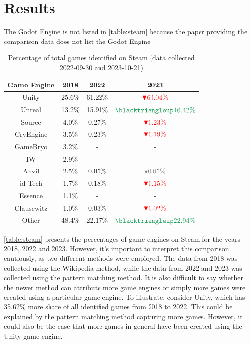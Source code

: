 \section{Results}
The Godot Engine is not listed in \autoref{table:steam} because the paper providing the comparison data does not list the Godot Engine. \\ 

\begin{table}[ht!]
    \centering
    \begin{tabular}{|c c c c|}
        \hline
        Game Engine & 2018   & 2022    & 2023    \\
        \hline\hline
        Unity       & 25.6\% & 61.22\% & $\textcolor{red}{\blacktriangledown 60.04\%}$  \\
        Unreal      & 13.2\% & 15.91\% & $\textcolor{ForestGreen}{\blacktriangleup 16.42\%}$  \\
        Source      & 4.0\%  & 0.27\%  & $\textcolor{red}{\blacktriangledown 0.23\%}$   \\
        CryEngine   & 3.5\%  & 0.23\%  & $\textcolor{red}{\blacktriangledown 0.19\%}$   \\
        GameBryo    & 3.2\%  & -       & -       \\
        IW          & 2.9\%  & -       & -       \\
        Anvil       & 2.5\%  & 0.05\%  & $\textcolor{gray}{\bullet 0.05\%}$   \\
        id Tech     & 1.7\%  & 0.18\%  & $\textcolor{red}{\blacktriangledown 0.15\%}$   \\
        Essence     & 1.1\%  & -       & -       \\
        Clausewitz  & 1.0\%  & 0.03\%  & $\textcolor{red}{\blacktriangledown 0.02\% }$  \\
        Other       & 48.4\% & 22.17\% & $\textcolor{ForestGreen}{\blacktriangleup 22.94\%}$  \\
        \hline
    \end{tabular}
    \caption{Percentage of total games identified on Steam (data collected 2022-09-30 and 2023-10-21)}
    \label{table:steam}
\end{table}

\autoref{table:steam} presents the percentages of game engines on Steam for the years 2018, 2022 and 2023.
However, it's important to interpret this comparison cautiously, as two different methods were employed.
The data from 2018 was collected using the Wikipedia method, while the data from 2022 and 2023 was collected using the pattern matching method.
It is also difficult to say whether the newer method can attribute more game engines or simply more games were created using a particular game engine.
To illustrate, consider Unity, which has 35.62\% more share of all identified games from 2018 to 2022.
This could be explained by the pattern matching method capturing more games.
However, it could also be the case that more games in general have been created using the Unity game engine.\\

